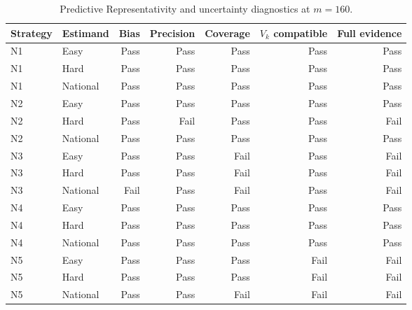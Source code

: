 \begin{table}[h!]
\centering
\small
\caption{Predictive Representativity and uncertainty diagnostics at $m=160$.}
\label{tab:nav-pr-status}
\begin{tabular}{llrrrrr}
\toprule
Strategy & Estimand & Bias & Precision & Coverage & $V_k$ compatible & Full evidence \\
\midrule
N1 & Easy & Pass & Pass & Pass & Pass & Pass \\
N1 & Hard & Pass & Pass & Pass & Pass & Pass \\
N1 & National & Pass & Pass & Pass & Pass & Pass \\
N2 & Easy & Pass & Pass & Pass & Pass & Pass \\
N2 & Hard & Pass & Fail & Pass & Pass & Fail \\
N2 & National & Pass & Pass & Pass & Pass & Pass \\
N3 & Easy & Pass & Pass & Fail & Pass & Fail \\
N3 & Hard & Pass & Pass & Fail & Pass & Fail \\
N3 & National & Fail & Pass & Fail & Pass & Fail \\
N4 & Easy & Pass & Pass & Pass & Pass & Pass \\
N4 & Hard & Pass & Pass & Pass & Pass & Pass \\
N4 & National & Pass & Pass & Pass & Pass & Pass \\
N5 & Easy & Pass & Pass & Pass & Fail & Fail \\
N5 & Hard & Pass & Pass & Pass & Fail & Fail \\
N5 & National & Pass & Pass & Fail & Fail & Fail \\
\bottomrule
\end{tabular}
\end{table}

